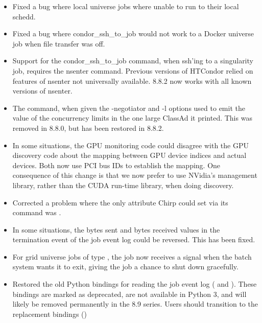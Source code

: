 \begin{itemize}

\item Fixed a bug where local universe jobs where unable to run
 to their local schedd.

\item Fixed a bug where condor\_ssh\_to\_job would not work to a Docker 
universe job when file transfer was off.

\item Support for the condor\_ssh\_to\_job command, when ssh'ing to a 
singularity job, requires the nsenter command.  Previous versions of HTCondor
relied on features of nsenter not universally available.  8.8.2 now
works with all known versions of nsenter.
\item The  command, when given the -negotiator and -l options
used to emit the value of the concurrency limits in the one large ClassAd it
printed.  This was removed in 8.8.0, but has been restored in 8.8.2.

\item In some situations, the GPU monitoring code could disagree with the
GPU discovery code about the mapping between GPU device indices and actual
devices.  Both now use PCI bus IDs to establish the mapping.  One consequence
of this change is that we now prefer to use NVidia's management library,
rather than the CUDA run-time library, when doing discovery.

\item Corrected a problem where the only attribute Chirp could
set via its  command was .

\item In some situations, the bytes sent and bytes received values in
the termination event of the job event log could be reversed.
This has been fixed.

\item For grid universe jobs of type , the job now receives a
signal when the batch system wants it to exit, giving the job a chance to
shut down gracefully.

\item Restored the old Python bindings for reading the job event log
( and ).
These bindings are marked as deprecated, are not available in
Python 3, and will likely be removed permanently in the 8.9 series.
Users should transition to the replacement bindings ()


\end{itemize}
